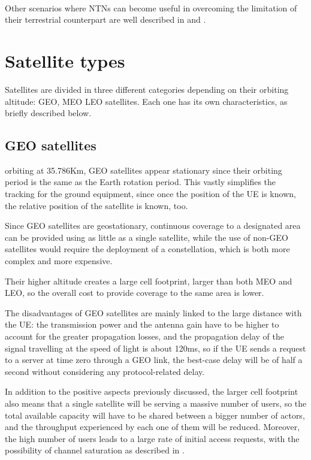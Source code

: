 \paragraph{} Other scenarios where \ac{NTNs} can become useful in overcoming the limitation of their terrestrial counterpart are well described in \cite{ntn-6g-era-challenges-giordani} and \cite{potential-multilayered-nierarchical-ntn-wang}.

\section{Satellite types}
Satellites are divided in three different categories depending on their orbiting altitude: \ac{GEO}, \ac{MEO} \ac{LEO} satellites. Each one has its own characteristics, as briefly described below.

\subsection{GEO satellites}
orbiting at 35.786Km, \ac{GEO} satellites appear stationary since their orbiting period is the same as the Earth rotation period. This vastly simplifies the tracking for the ground equipment, since once the position of the \ac{UE} is known, the relative position of the satellite is known, too.
    
Since \ac{GEO} satellites are geostationary, continuous coverage to a designated area can be provided using as little as a single satellite, while the use of non-\ac{GEO} satellites would require the deployment of a constellation, which is both more complex and more expensive.

Their higher altitude creates a large cell footprint, larger than both \ac{MEO} and \ac{LEO}, so the overall cost to provide coverage to the same area is lower.

The disadvantages of \ac{GEO} satellites are mainly linked to the large distance with the \ac{UE}: the transmission power and the antenna gain have to be higher to account for the greater propagation losses, and the propagation delay of the signal travelling at the speed of light is about 120ms, so if the \ac{UE} sends a request to a server at time zero through a \ac{GEO} link, the best-case delay will be of half a second without considering any protocol-related delay.

In addition to the positive aspects previously discussed, the larger cell footprint also means that a single satellite will be serving a massive number of users, so the total available capacity will have to be shared between a bigger number of actors, and the throughput experienced by each one of them will be reduced. 
Moreover, the high number of users leads to a large rate of initial access  requests, with the possibility of channel saturation as described in \cite{3gpp-tr-38.811}.

